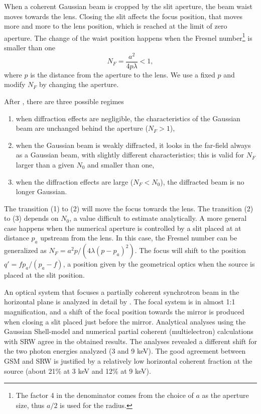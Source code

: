 \documentclass{iucr}              %
\begin{document}
When a coherent Gaussian beam is cropped by the slit aperture, the beam waist moves towards the lens. Closing the slit affects the focus position, that moves more and more to the lens position, which is reached at the limit of zero aperture. The change of the waist position happens when the Fresnel number\footnote{
The factor 4 in the denominator comes from the choice of $a$ as the aperture size, thus $a/2$ is used for the radius.} is smaller than one
\begin{equation}
    N_F = \frac{a^2}{4 p \lambda}  < 1,
\end{equation}
where $p$ is the distance from the aperture to the lens. We use a fixed $p$ and modify $N_F$ by changing the aperture.  

After , there are three possible regimes 
\begin{enumerate}
\item when diffraction effects are negligible, the
characteristics of the Gaussian beam are unchanged
behind the aperture ($N_F>1$),
\item when the Gaussian
beam is weakly diffracted, it looks in the far-field always as a Gaussian beam, with slightly different characteristics; this is valid for $N_F$ larger than a given $N_0$ and smaller than one,
\item when the diffraction effects are large ($N_F<N_0$),
the diffracted beam is no longer Gaussian.
\end{enumerate}

The transition (1) to (2) will move the focus towards the lens. The transition (2) to (3) depends on $N_0$, a value difficult to estimate analytically. A more general case happens when the numerical aperture is controlled by a slit placed at at distance $p_a$ upstream from the lens. 
In this case, the Fresnel number can be generalized as $N_F=a^2 p / (4 \lambda (p-p_a)^2)$. The focus will shift to the position $q'=f p_a/(p_a-f)$, a position given by the geometrical optics when the source is placed at the slit position. 

An optical system that focuses a partially coherent synchrotron beam in the horizontal plane is analyzed in detail by . The focal system is in almost 1:1 magnification, and a shift of the focal position towards the mirror is produced when closing a slit placed just before the mirror. Analytical analyses using the Gaussian Shell-model and numerical partial coherent (multielectron) calculations with SRW \cite{codeSRW} agree in the obtained results. The analyses revealed a different shift for the two photon energies analyzed (3 and 9 keV). The good agreement between GSM and SRW is justified by a relatively low horizontal coherent fraction at the source (about 21\% at 3 keV and 12\% at 9 keV).
 
\end{document}
